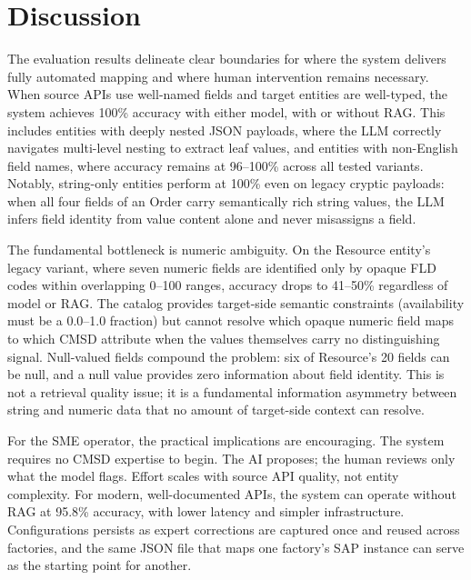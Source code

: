 \documentclass[3p,times,procedia]{elsarticle}
\begin{document}
\section{Discussion}
\label{sec:discussion}

The evaluation results delineate clear boundaries for where the system delivers fully automated mapping and where human intervention remains necessary. When source APIs use well-named fields and target entities are well-typed, the system achieves 100\% accuracy with either model, with or without RAG. This includes entities with deeply nested JSON payloads, where the LLM correctly navigates multi-level nesting to extract leaf values, and entities with non-English field names, where accuracy remains at 96--100\% across all tested variants. Notably, string-only entities perform at 100\% even on legacy cryptic payloads: when all four fields of an Order carry semantically rich string values, the LLM infers field identity from value content alone and never misassigns a field.

The fundamental bottleneck is numeric ambiguity. On the Resource entity's legacy variant, where seven numeric fields are identified only by opaque FLD codes within overlapping 0--100 ranges, accuracy drops to 41--50\% regardless of model or RAG. The catalog provides target-side semantic constraints (availability must be a 0.0--1.0 fraction) but cannot resolve which opaque numeric field maps to which CMSD attribute when the values themselves carry no distinguishing signal. Null-valued fields compound the problem: six of Resource's 20 fields can be null, and a null value provides zero information about field identity. This is not a retrieval quality issue; it is a fundamental information asymmetry between string and numeric data that no amount of target-side context can resolve.

For the SME operator, the practical implications are encouraging. The system requires no CMSD expertise to begin. The AI proposes; the human reviews only what the model flags. Effort scales with source API quality, not entity complexity. For modern, well-documented APIs, the system can operate without RAG at 95.8\% accuracy, with lower latency and simpler infrastructure. Configurations persists as expert corrections are captured once and reused across factories, and the same JSON file that maps one factory's SAP instance can serve as the starting point for another.
\end{document}
